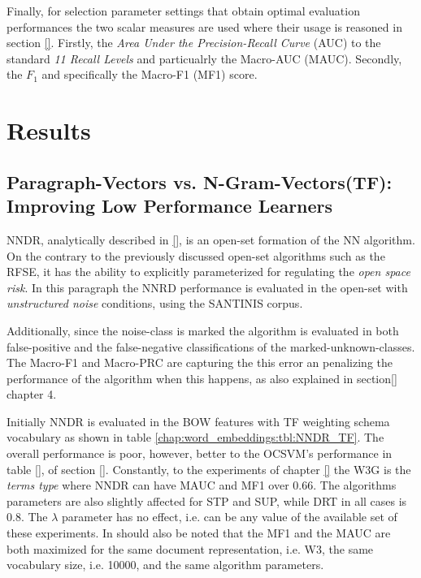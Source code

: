 Finally, for selection parameter settings that obtain optimal evaluation performances the two scalar measures are used where their usage is reasoned in section \ref{}. Firstly, the \textit{Area Under the Precision-Recall Curve} (AUC) to the  standard \textit{11 Recall Levels} and particualrly the Macro-AUC (MAUC). Secondly, the $F_{1}$ and specifically the Macro-F1 (MF1) score.

\section{Results}\label{chap:word_embeddings:sec:results}

\subsection{Paragraph-Vectors vs. N-Gram-Vectors(TF): Improving Low Performance Learners}\label{chap:word_embeddings:sec:NNDR_PVBOW_vs_BOW}

NNDR, analytically described in \ref{}, is an open-set formation of the NN algorithm. On the contrary to the previously discussed open-set algorithms such as the RFSE, it has the ability to explicitly parameterized for regulating the \textit{open space risk}. In this paragraph the NNRD performance is evaluated in the open-set with \textit{unstructured noise} conditions, using the SANTINIS corpus.

Additionally, since the noise-class is marked the algorithm is evaluated in both false-positive and the false-negative classifications of the marked-unknown-classes. The Macro-F1 and Macro-PRC are capturing the this error an penalizing the performance of the algorithm when this happens, as also explained in section\ref{} chapter 4.

Initially NNDR is evaluated in the BOW features with TF weighting schema vocabulary as shown in table \ref{chap:word_embeddings:tbl:NNDR_TF}. The overall performance is poor, however, better to the OCSVM's performance in table \ref{}, of section \ref{}. Constantly, to the experiments of chapter \ref{} the W3G is the \textit{terms type} where NNDR can have MAUC and MF1 over $0.66$. The algorithms parameters are also slightly affected for STP and SUP, while DRT in all cases is $0.8$. The $\lambda$ parameter has no effect, i.e. can be any value of the available set of these experiments. In should also be noted that the MF1 and the MAUC are both maximized for the same document representation, i.e. W3, the same vocabulary size, i.e. 10000, and the same algorithm parameters.

